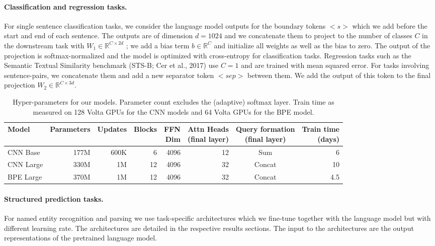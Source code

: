 \documentclass[11pt,a4paper]{article}
\renewcommand{\Re}{\mathbb{R}}
\begin{document}
\paragraph{Classification and regression tasks.}
For single sentence classification tasks, we consider the language model outputs for the boundary tokens $<s>$ which we add before the start and end of each sentence.
The outputs are of dimension $d=1024$ and we concatenate them to project to the number of classes $C$ in the downstream task with $W_{1} \in \Re^{C \times 2d}$ \citep{radford2018unsup};
we add a bias term $b \in \Re^C$ and initialize all weights as well as the bias to zero.
The output of the projection is softmax-normalized and the model is optimized with cross-entropy for classification tasks. 
Regression tasks such as the Semantic Textual Similarity benchmark (STS-B; Cer et al., 2017)\nocite{cer2017stsb} use $C=1$ and are trained with mean squared error.
For tasks involving sentence-pairs, we concatenate them and add a new separator token $<sep>$ between them. 
We add the output of this token to the final projection $W_{2} \in \Re^{C \times 3d}$.

\begin{table*}[t]
\centering
\begin{tabular}{lrrrrrcr}
\toprule
\bf Model & \bf Parameters & \bf Updates & \bf Blocks & \bf \thead{FFN\\ Dim} & \bf \thead{Attn Heads\\ (final layer)} & \bf \thead{Query formation\\ (final layer)} & \bf \thead{Train time\\ (days)} \\ \midrule
CNN Base & 177M & 600K & 6 & 4096 & 12 & Sum & 6 \\
CNN Large & 330M & 1M & 12 & 4096 & 32 & Concat & 10 \\
BPE Large & 370M & 1M & 12 & 4096 & 32 & Concat & 4.5 \\
\bottomrule
\end{tabular}
\caption{Hyper-parameters for our models. Parameter count excludes the (adaptive) softmax layer. Train time as measured on 128 Volta GPUs for the CNN models and 64 Volta GPUs for the BPE model.}
\label{tab:model_params}
\end{table*}


\paragraph{Structured prediction tasks.}
For named entity recognition and parsing we use task-specific architectures which we fine-tune together with the language model but with different learning rate.  
The architectures are detailed in the respective results sections.
The input to the architectures are the output representations of the pretrained language model.
\end{document}
